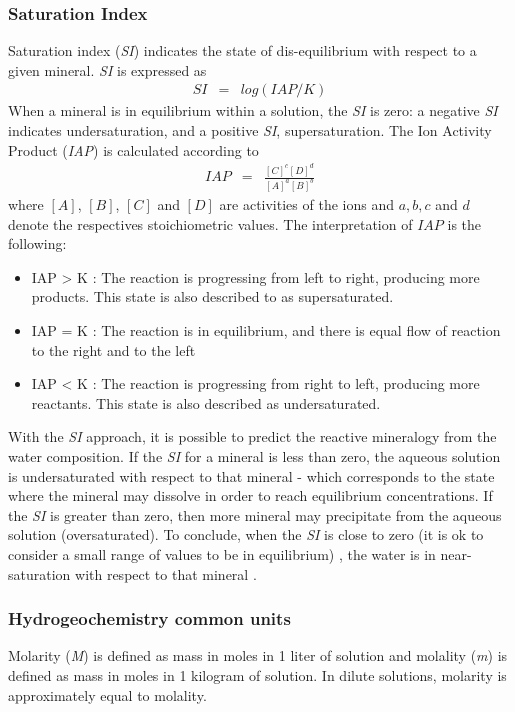 \subsubsection{Saturation Index}
Saturation index (\emph{SI}) indicates the state of dis-equilibrium with respect to a given mineral. \emph{SI} is expressed as
\begin{eqnarray} \label{eq:siEq}
SI &=& log (IAP / K )
\end{eqnarray}
When a mineral is in equilibrium within a solution, the \emph{SI} is zero: a negative \emph{SI} indicates undersaturation, and a positive \emph{SI}, supersaturation. 
The Ion Activity Product (\emph{IAP}) is calculated according to
\begin{eqnarray}
IAP &=& \frac{[C]^c [D]^d}{[A]^a[B]^b}
\end{eqnarray}
where $[A]$, $[B]$, $[C]$ and $[D]$ are activities of the ions and $a, b, c$ and $d$ denote the respectives stoichiometric values. The interpretation of $IAP$ is the following:
\begin{itemize}
\item IAP > K : The reaction is progressing from left to right, producing more products. This state is also described to as supersaturated.
\item IAP = K : The reaction is in equilibrium, and there is equal flow of reaction to the right and to the left
\item IAP < K : The reaction is progressing from right to left, producing more reactants. This state is also described as undersaturated.
\end{itemize}

With the \emph{SI} approach, it is possible to predict the reactive mineralogy from the water composition. If the \emph{SI} for a mineral is less than zero, the aqueous solution is undersaturated with respect to that mineral - which corresponds to the state where the mineral may dissolve in order to reach equilibrium concentrations. If the \emph{SI} is greater than zero, then more mineral may precipitate from the aqueous solution (oversaturated). To conclude, when the \emph{SI} is close to zero (it is ok to consider a small range of values to be in equilibrium) , the water is in near- saturation  with respect to that mineral \cite{Alley:93}. 


\subsubsection{Hydrogeochemistry common units}
Molarity (\emph{M}) is defined as mass in moles in 1 liter of solution and molality (\emph{m}) is defined as mass in moles in 1 kilogram of solution. In dilute solutions, molarity is approximately equal to molality. 

